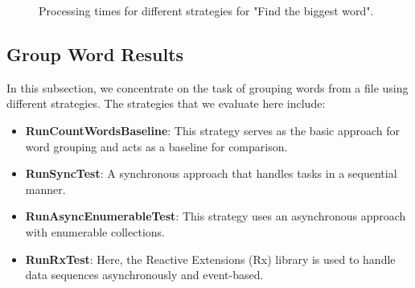 \begin{figure}[H]
    \raggedright
    \caption{Processing times for different strategies for "Find the biggest word".}
    \label{fig:biggest_word_results_cs_2}
\end{figure}

\clearpage


\subsection{Group Word Results}
\label{subsubsec:group_word_processing_times_cs}

In this subsection, we concentrate on the task of grouping words from a file using different strategies. The strategies that we evaluate here include:

\begin{itemize}
    \item \textbf{RunCountWordsBaseline}: This strategy serves as the basic approach for word grouping and acts as a baseline for comparison.
    \item \textbf{RunSyncTest}: A synchronous approach that handles tasks in a sequential manner.
    \item \textbf{RunAsyncEnumerableTest}: This strategy uses an asynchronous approach with enumerable collections.
    \item \textbf{RunRxTest}: Here, the Reactive Extensions (Rx) library is used to handle data sequences asynchronously and event-based.
\end{itemize}


\begin{table}[H]
    \centering
    \caption{Processing times for different strategies for "Count Words".}
    \label{tab:group_word_processing_times_cs}
\end{table}


